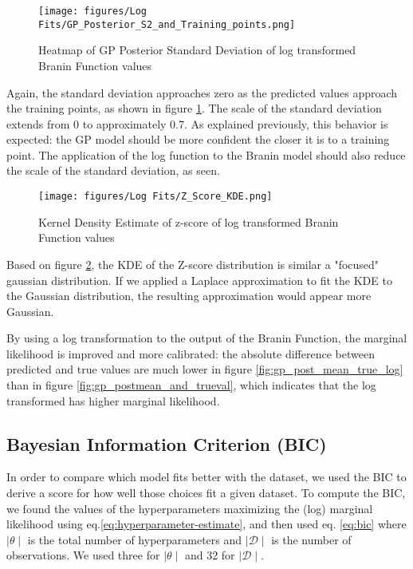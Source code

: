 \documentclass[11pt]{article}
\newcommand{\mc}[1]{\mathcal{#1}}
\newcommand{\data}{\mc{D}}
\numberwithin{equation}{section}
\begin{document}
\begin{figure}[H]
  \centering
  \texttt{[image: figures/Log Fits/GP\_Posterior\_S2\_and\_Training\_points.png]}
  \caption{Heatmap of GP Posterior Standard Deviation of log transformed Branin Function values}
  \label{fig:gp_post_std_log}
\end{figure}
Again, the standard deviation approaches zero as the predicted values approach the training points, as shown in figure \ref{fig:gp_post_std_log}. The scale of the standard deviation extends from 0 to approximately 0.7. As explained previously, this behavior is expected: the GP model should be more confident the closer it is to a training point. The application of the log function to the Branin model should also reduce the scale of the standard deviation, as seen. 

\begin{figure}[H]
  \centering
  \texttt{[image: figures/Log Fits/Z\_Score\_KDE.png]}
  \caption{Kernel Density Estimate of z-score of log transformed Branin Function values}
  \label{fig:zscore_kde_log}
\end{figure}
Based on figure \ref{fig:zscore_kde_log}, the KDE of the Z-score distribution is similar a "focused" gaussian distribution. If we applied a Laplace approximation to fit the KDE to the Gaussian distribution, the resulting approximation would appear more Gaussian.

By using a log transformation to the output of the Branin Function, the marginal likelihood is improved and more calibrated: the absolute difference between predicted and true values are much lower in figure \ref{fig:gp_post_mean_true_log} than in figure \ref{fig:gp_postmean_and_trueval}, which indicates that the log transformed has higher marginal likelihood.

\subsection*{Bayesian Information Criterion (BIC)}
In order to compare which model fits better with the dataset, we used the BIC to derive a score for how well those choices fit a given dataset. To compute the BIC, we found the values of the hyperparameters maximizing the (log) marginal likelihood using eq.\ref{eq:hyperparameter-estimate}, and then used eq. \ref{eq:bic} where $\mid \theta \mid$ is the total number of hyperparameters and $\mid \data \mid$ is the number of observations. We used three for $\mid \theta \mid$ and 32 for $\mid \data \mid$. 
\end{document}
